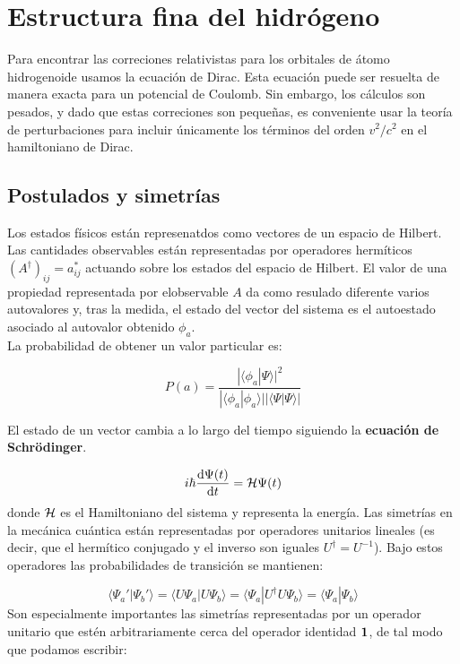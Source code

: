 \chapter{Estructura fina del hidrógeno}

Para encontrar las correciones relativistas para los orbitales de átomo hidrogenoide usamos la ecuación de Dirac. Esta ecuación puede ser resuelta de manera exacta para un potencial de Coulomb. Sin embargo, los cálculos son pesados, y dado que estas correciones son pequeñas, es conveniente usar la teoría de perturbaciones para incluir únicamente los términos del orden $v^2/c^2$ en el hamiltoniano de Dirac. 
 

\section{Postulados y simetrías}

Los estados físicos están represenatdos como vectores de un espacio de Hilbert. Las cantidades observables están representadas por operadores hermíticos $(A^{\dagger})_{ij} = a_{ij}^*$ actuando sobre los estados del espacio de Hilbert. El valor de una propiedad representada por elobservable $A$ da como resulado diferente varios autovalores y, tras la medida, el estado del vector del sistema es el autoestado asociado al autovalor obtenido $\phi_a$. \\

La probabilidad de obtener un valor particular es:

\begin{equation}
    P(a)= \frac{|\langle \phi_a | \Psi \rangle |^2}{|\langle \phi_a | \phi_a \rangle ||\langle \Psi | \Psi \rangle |}
\end{equation}

El estado de un vector cambia a lo largo del tiempo siguiendo la {\bf ecuación de Schrödinger}.

\begin{equation}
    i\hbar \frac{\mathrm{d} \Psi(t)}{\mathrm{d} t} = \mathcal{H} \Psi (t) 
\end{equation}
donde $\mathcal{H}$ es el Hamiltoniano del sistema y representa la energía. Las simetrías en la mecánica cuántica están representadas por operadores unitarios lineales (es decir, que el hermítico conjugado y el inverso son iguales $U^{\dagger}=U^{-1}$). Bajo estos operadores las probabilidades de transición se mantienen:

\begin{equation}
    \langle \Psi_a' | \Psi_b ' \rangle = \langle U \Psi_a | U \Psi_b \rangle = \langle \Psi_a | U^{\dagger} U \Psi_b\rangle = \langle \Psi_a | \Psi_b \rangle
\end{equation}
Son especialmente importantes las simetrías representadas por un operador unitario que estén arbitrariamente cerca del operador identidad $\mathbf{1}$, de tal modo que podamos escribir:

